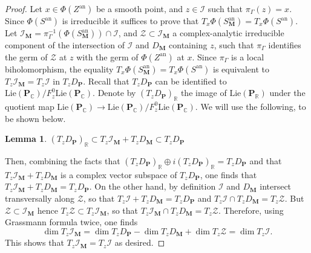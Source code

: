 \documentclass[10pt]{article}
\numberwithin{equation}{subsection}
\theoremstyle{plain}
\newtheorem{lemma}[theorem]{Lemma}
\theoremstyle{definition}
\theoremstyle{remark}
\newcommand{\lie}{\mathrm{Lie}}
\newcommand{\I}{\mathscr{I}}
\newcommand{\C}{\mathbb C}
\newcommand{\R}{\mathbb R}
\newcommand{\pp}{\mathbf P}
\newcommand{\M}{\mathbf M}
\newcommand{\an}{\mathrm{an}}
\newcommand{\Zcal}{\mathscr{Z}}
\begin{document}
\begin{proof}
Let $x \in \Phi(Z^\an)$ be a smooth point, and $z \in \I$ such that $\pi_\Gamma(z) = x$. Since $\Phi(S^\an)$ is irreducible it suffices to prove that $T_x \Phi(S_\M^\an) = T_x \Phi(S^\an)$. Let $\I_\M = \pi_\Gamma^{-1}(\Phi(S_\M^\an)) \cap \I$, and $\Zcal \subset \I_\M$ a complex-analytic irreducible component of the intersection of $\I$ and $D_\M$ containing $z$, such that $\pi_\Gamma$ identifies the germ of $\Zcal$ at $z$ with the germ of $\Phi(Z^\an)$ at $x$. Since $\pi_\Gamma$ is a local biholomorphism, the equality $T_x \Phi(S_\M^\an) = T_x \Phi(S^\an)$ is equivalent to $T_z \I_\M = T_z \I$ in $T_z D_\pp$. Recall that $T_z D_\pp$ can be identified to $\lie(\pp_\C)/ F_z^0 \lie(\pp_\C)$. Denote by $(T_z D_\pp)_\R$ the image of $\lie(\pp_\R)$ under the quotient map $\lie(\pp_\C) \rightarrow \lie(\pp_\C) / F_z^0 \lie(\pp_\C)$. We will use the following, to be shown below.
\begin{lemma}\label{realsub}
$(T_z D_\pp)_\R \subset T_z \I_\M + T_z D_\M \subset T_z D_\pp$
\end{lemma}
Then, combining the facts that $(T_z D_\pp)_\R \oplus i (T_z D_\pp)_\R = T_z D_\pp$ and that $T_z \I_\M + T_z D_\M$ is a complex vector subspace of $T_z D_\pp$, one finds that $T_z \I_\M + T_z D_\M = T_z D_\pp$. On the other hand, by definition $\I$ and $D_\M$ intersect transversally along $\Zcal$, so that $T_z \I + T_z D_\M = T_z D_\pp$ and $T_z \I \cap T_z D_\M = T_z \Zcal$. But $\Zcal \subset \I_\M$ hence $T_z \Zcal \subset T_z \I_\M$, so that $T_z \I_\M \cap T_z D_\M = T_z \Zcal$.  Therefore, using Grassmann formula twice, one finds
\[
\dim T_z \I_\M  = \dim T_z D_\pp - \dim T_z D_\M + \dim T_z \Zcal = \dim T_z \I.
\]
This shows that $T_z \I_\M = T_z \I$ as desired.
\end{proof}
\end{document}
